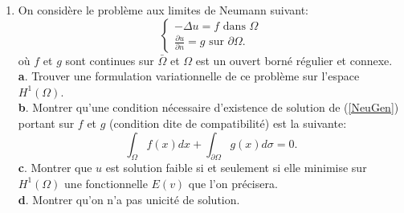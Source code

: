 \documentclass[12pt,a4paper]{article}
\begin{document}
\begin{enumerate}
\item On consid\`ere le probl\`eme aux limites de Neumann suivant:
\begin{equation}\label{NeuGen}
\begin{cases}
-\Delta u = f \text{ dans }\Omega\\
\frac{\partial u}{\partial n} = g \text{ sur }\partial\Omega.
\end{cases}
\end{equation}
o\`u $f$ et $g$ sont continues sur $\bar\Omega$ et $\Omega$ est un ouvert born\'e r\'egulier et connexe.\\
{\bf a}. Trouver une formulation variationnelle de ce probl\`eme sur l'espace $H^1(\Omega)$.\\
{\bf b}. Montrer qu'une condition n\'ecessaire d'existence de solution
de (\ref{NeuGen}) portant sur $f$ et $g$ (condition dite de
compatibilit\'e) est la suivante:
$$
\int_{\Omega}f(x)dx+ \int_{\partial\Omega} g(x)d\sigma= 0.
$$
{\bf c}. Montrer que $u$ est solution faible si et seulement si elle minimise sur $H^1(\Omega)$ une fonctionnelle $E(v)$ que l'on pr\'ecisera.\\
{\bf d}. Montrer qu'on n'a pas unicité de solution.

\end{enumerate}

\end{document}
